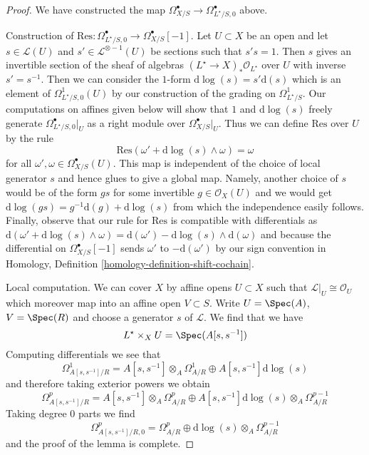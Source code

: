 \begin{proof}
We have constructed the map
$\Omega^\bullet_{X/S} \to \Omega^\bullet_{L^\star/S, 0}$ above.

\medskip\noindent
Construction of
$\text{Res} : \Omega^\bullet_{L^\star/S, 0} \to \Omega^\bullet_{X/S}[-1]$.
Let $U \subset X$ be an open and let $s \in \mathcal{L}(U)$
and $s' \in \mathcal{L}^{\otimes -1}(U)$ be sections such that
$s' s = 1$. Then $s$ gives an invertible section of the sheaf of
algebras $(L^\star \to X)_*\mathcal{O}_{L^\star}$ over $U$
with inverse $s' = s^{-1}$. Then we can consider the $1$-form
$\text{d}\log(s) = s' \text{d}(s)$ which is an element of
$\Omega^1_{L^\star/S, 0}(U)$ by our construction of the grading on
$\Omega^1_{L^\star/S}$. Our computations on affines given below
will show that $1$ and $\text{d}\log(s)$ freely generate
$\Omega^\bullet_{L^\star/S, 0}|_U$ as a right module over
$\Omega^\bullet_{X/S}|_U$.
Thus we can define $\text{Res}$ over $U$ by the rule
$$
\text{Res}(\omega' + \text{d}\log(s) \wedge \omega) = \omega
$$
for all $\omega', \omega \in \Omega^\bullet_{X/S}(U)$. This
map is independent of the choice of local generator $s$ and hence
glues to give a global map. Namely, another choice of $s$
would be of the form $gs$ for some invertible $g \in \mathcal{O}_X(U)$
and we would get $\text{d}\log(gs) = g^{-1}\text{d}(g) + \text{d}\log(s)$
from which the independence easily follows.
Finally, observe that our rule for $\text{Res}$
is compatible with differentials
as $\text{d}(\omega' + \text{d}\log(s) \wedge \omega) =
\text{d}(\omega') - \text{d}\log(s) \wedge \text{d}(\omega)$
and because the differential on $\Omega^\bullet_{X/S}[-1]$
sends $\omega'$ to $-\text{d}(\omega')$ by our sign convention in
Homology, Definition \ref{homology-definition-shift-cochain}.

\medskip\noindent
Local computation. We can cover $X$ by affine opens $U \subset X$
such that $\mathcal{L}|_U \cong \mathcal{O}_U$ which moreover map
into an affine open $V \subset S$. Write $U = \Spec(A)$, $V = \Spec(R)$
and choose a generator $s$ of $\mathcal{L}$. We find that we have
$$
L^\star \times_X U = \Spec(A[s, s^{-1}])
$$
Computing differentials we see that
$$
\Omega^1_{A[s, s^{-1}]/R} =
A[s, s^{-1}] \otimes_A \Omega^1_{A/R} \oplus A[s, s^{-1}] \text{d}\log(s)
$$
and therefore taking exterior powers we obtain
$$
\Omega^p_{A[s, s^{-1}]/R} =
A[s, s^{-1}] \otimes_A \Omega^p_{A/R}
\oplus
A[s, s^{-1}] \text{d}\log(s) \otimes_A \Omega^{p - 1}_{A/R}
$$
Taking degree $0$ parts we find
$$
\Omega^p_{A[s, s^{-1}]/R, 0} =
\Omega^p_{A/R} \oplus \text{d}\log(s) \otimes_A \Omega^{p - 1}_{A/R}
$$
and the proof of the lemma is complete.
\end{proof}

